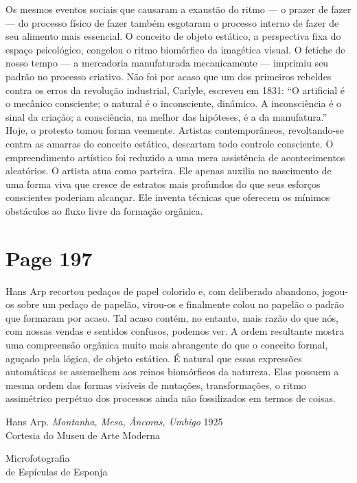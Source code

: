 \documentclass[a4paper]{article}
\begin{document}
Os mesmos eventos sociais que causaram a exaustão do ritmo --- o prazer de fazer --- do processo físico de fazer também esgotaram o processo interno de fazer de seu alimento mais essencial. O conceito de objeto estático, a perspectiva fixa do espaço psicológico, congelou o ritmo biomórfico da imagética visual. O fetiche de nosso tempo --- a mercadoria manufaturada mecanicamente --- imprimiu seu padrão no processo criativo. Não foi por acaso que um dos primeiros rebeldes contra os erros da revolução industrial, Carlyle, escreveu em 1831: ``O artificial é o mecânico consciente; o natural é o inconsciente, dinâmico. A inconsciência é o sinal da criação; a consciência, na melhor das hipóteses, é a da manufatura.'' Hoje, o protesto tomou forma veemente. Artistas contemporâneos, revoltando-se contra as amarras do conceito estático, descartam todo controle consciente. O empreendimento artístico foi reduzido a uma mera assistência de acontecimentos aleatórios. O artista atua como parteira. Ele apenas auxilia no nascimento de uma forma viva que cresce de estratos mais profundos do que seus esforços conscientes poderiam alcançar. Ele inventa técnicas que oferecem os mínimos obstáculos ao fluxo livre da formação orgânica.

\vspace*{\fill}

\newpage
\section*{Page 197}

Hans Arp recortou pedaços de papel colorido e, com deliberado abandono, jogou-os sobre um pedaço de papelão, virou-os e finalmente colou no papelão o padrão que formaram por acaso. Tal acaso contém, no entanto, mais razão do que nós, com nossas vendas e sentidos confusos, podemos ver. A ordem resultante mostra uma compreensão orgânica muito mais abrangente do que o conceito formal, aguçado pela lógica, de objeto estático. É natural que essas expressões automáticas se assemelhem aos reinos biomórficos da natureza. Elas possuem a mesma ordem das formas visíveis de mutações, transformações, o ritmo assimétrico perpétuo dos processos ainda não fossilizados em termos de coisas.

Hans Arp. \textit{Montanha, Mesa, Âncoras, Umbigo} 1925\\
Cortesia do Museu de Arte Moderna

Microfotografia\\
de Espículas de Esponja
\end{document}
